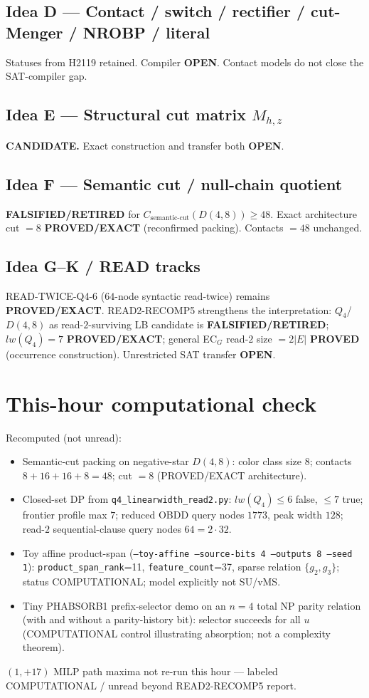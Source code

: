 \documentclass[11pt]{article}
\begin{document}
\subsection*{Idea D --- Contact / switch / rectifier / cut-Menger / NROBP / literal}
Statuses from H2119 retained. Compiler \textbf{OPEN}. Contact models do not close the SAT-compiler gap.

\subsection*{Idea E --- Structural cut matrix $M_{h,z}$}
\textbf{CANDIDATE.} Exact construction and transfer both \textbf{OPEN}.

\subsection*{Idea F --- Semantic cut / null-chain quotient}
\textbf{FALSIFIED/RETIRED} for $C_{\mathrm{semantic\textrm{-}cut}}(D(4,8))\ge48$.
Exact architecture cut $=8$ \textbf{PROVED/EXACT} (reconfirmed packing). Contacts $=48$ unchanged.

\subsection*{Idea G--K / READ tracks}
READ-TWICE-Q4-6 ($64$-node syntactic read-twice) remains \textbf{PROVED/EXACT}.
READ2-RECOMP5 strengthens the interpretation: $Q_4$/$D(4,8)$ as read-$2$-surviving LB candidate is
\textbf{FALSIFIED/RETIRED}; $lw(Q_4)=7$ \textbf{PROVED/EXACT}; general EC$_G$ read-$2$ size
$=2|E|$ \textbf{PROVED} (occurrence construction). Unrestricted SAT transfer \textbf{OPEN}.

\section*{This-hour computational check}
Recomputed (not unread):
\begin{itemize}
\item Semantic-cut packing on negative-star $D(4,8)$: color class size $8$; contacts
  $8+16+16+8=48$; cut $=8$ (PROVED/EXACT architecture).
\item Closed-set DP from \texttt{q4\_linearwidth\_read2.py}: $lw(Q_4)\le6$ false, $\le7$ true;
  frontier profile max $7$; reduced OBDD query nodes $1773$, peak width $128$;
  read-$2$ sequential-clause query nodes $64=2\cdot32$.
\item Toy affine product-span (\texttt{--toy-affine --source-bits 4 --outputs 8 --seed 1}):
  \texttt{product\_span\_rank}=11, \texttt{feature\_count}=37, sparse relation $\{g_2,g_3\}$;
  status COMPUTATIONAL; model explicitly not SU/vMS.
\item Tiny PHABSORB1 prefix-selector demo on an $n=4$ total NP parity relation (with and without
  a parity-history bit): selector succeeds for all $u$ (COMPUTATIONAL control illustrating
  absorption; not a complexity theorem).
\end{itemize}
$(1,+17)$ MILP path maxima not re-run this hour --- labeled COMPUTATIONAL / unread beyond
READ2-RECOMP5 report.
\end{document}
